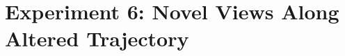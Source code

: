 

\begin{comment}
- As expected, the camera optimizer provides better results than the contrary on real data with imperfect camera poses. Atleast it ha a significantly higher PSNR, how do they compare qualitatively?
- As with the synthetic data, the optimized runs appear more blurry, but still achieves better scores on the metrics.


In the set of experiments that did not implement the naive Block-NeRF approach, the results display noteworthy distinctions between different methodologies. The experiment wherein camera poses were approximated using COLMAP and subsequently optimized rendered the highest Peak Signal-to-Noise Ratio (PSNR). This particular experiment demonstrates superior performance in preserving original image detail and quality.

However, interestingly, the experiment utilizing COLMAP without any subsequent optimization yielded the best results in terms of the Structural Similarity Index Measure (SSIM) and the Learned Perceptual Image Patch Similarity (LPIPS). Despite these metrics being extremely close to the COLMAP run with optimization, their distinction in results is worth noting.

Delving deeper into qualitative outcomes, a stark contrast is observed between the two COLMAP runs. The experiment leveraging optimized camera poses generated results with a distinctly higher degree of blurriness compared to its counterpart that did not utilize optimized poses.

This observation highlights the intriguing impact of pose optimization on image clarity and indicates that while certain metrics might be optimized, subjective visual quality and the overall objective might vary significantly. These results collectively underline the complex interplay between technical metrics and perceptual outcomes in the realm of NeRF generation.
\end{comment}

\section{Experiment 6: Novel Views Along Altered Trajectory} \label{sec:altered-trajectories}

